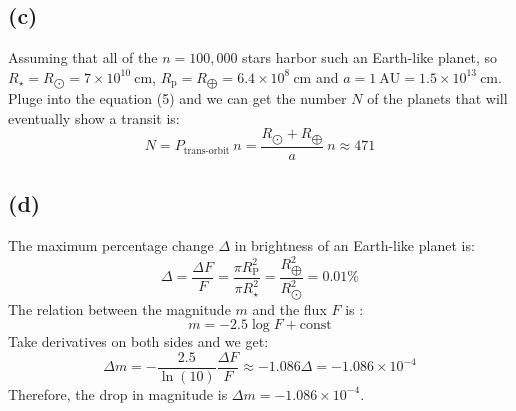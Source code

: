 \documentclass[a4paper,12pt]{article}
\begin{document}
\subsection*{(c)}
Assuming that all of the $n = 100,000$ stars harbor such an Earth-like planet, 
so $R_{\star} = R_{\bigodot} = 7 \times 10^{10} \ \text{cm}$, 
$R_\text{p} = R_{\bigoplus } = 6.4 \times 10^{8} \ \text{cm}$ and 
$a = 1\ \text{AU} = 1.5 \times 10^{13} \ \text{cm}$.
Pluge into the equation (5) and we can get the number $N$
of the planets that will eventually show a transit is:
\begin{equation}
    N = P_{\text{trans-orbit}} \ n  = \frac{R_{\bigodot} + R_{\bigoplus}}{a} \ n \approx 471 
\end{equation}

\subsection*{(d)}
The maximum percentage change $\Delta$ in brightness 
of an Earth-like planet is:
\begin{equation}
    \Delta = \frac{\Delta F}{F} = \frac{\pi R_\text{P}^2}{\pi R_\star^2}
     = \frac{R_{\bigoplus}^2}{R_{\bigodot}^2}
     = 0.01 \%
\end{equation}
The relation between the magnitude $m$ and the flux $F$
is :
\begin{equation}
    m = -2.5 \log F + \text{const}
\end{equation}
Take derivatives on both sides and we get:
\begin{equation}
    \Delta m = -\frac{2.5}{\ln (10)} \frac{\Delta F}{F} \approx -1.086 \Delta = -1.086 \times 10^{-4}
\end{equation}
Therefore, the drop in magnitude is $\Delta m = -1.086 \times 10^{-4}$.
\end{document}

